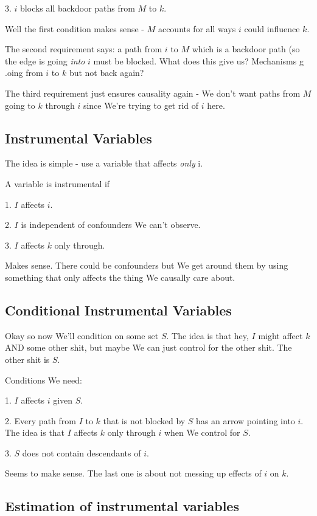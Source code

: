 \documentclass{article}
\begin{document}
		3. $i$ blocks all backdoor paths from $M$ to $k$.
		
		Well the first condition makes sense - $M$ accounts for all ways $i$ could influence $k$.
		
		The second requirement says: a path from $i$ to $M$ which is a backdoor path (so the edge is going \textit{into} $i$ must be blocked. What does this give us? Mechanisms g
		.oing from $i$ to $k$ but not back again? 
		
		The third requirement just ensures causality again - We don't want paths from $M$ going to $k$ through $i$ since We're trying to get rid of $i$ here.
		
	\subsection{Instrumental Variables}
	
		The idea is simple - use a variable that affects \textit{only} i. 
		
		A variable is instrumental if 
		
		1. $I$ affects $i$.
		
		2. $I$ is independent of confounders We can't observe.
		
		3. $I$ affects $k$ only through.
		
		Makes sense. There could be confounders but We get around them by using something  that only affects the thing We causally care about.
		
	\subsection{Conditional Instrumental Variables}
	
		Okay so now We'll condition on some set $S$. The idea is  that hey, $I$ might affect $k$ AND some other shit, but maybe We can just control for the other shit. The other shit is $S$.
		
		Conditions We need:
		
		1. $I$ affects $i$ given $S$.
		
		2. Every path from $I$ to $k$ that is not blocked by $S$ has an arrow pointing into $i$. The idea is that $I$ affects $k$ only through $i$ when We control for $S$.
		
		3. $S$ does not contain descendants of $i$.
		
		Seems to make sense. The last one is about not messing up effects of $i$ on $k$.
		 
	\subsection{Estimation of instrumental variables}
	
\end{document}
